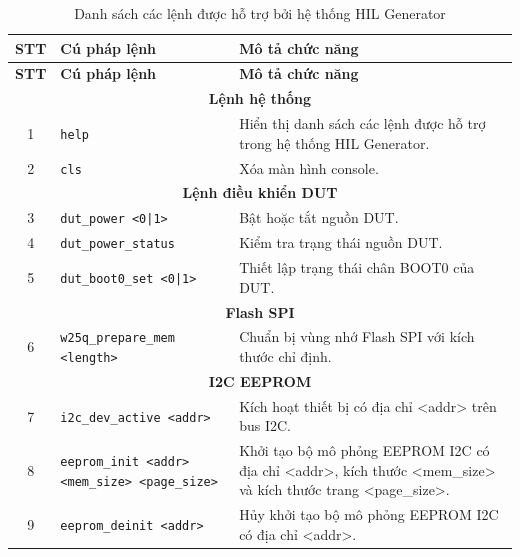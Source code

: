 \begin{longtable}{|c|p{4.8cm}|p{7.2cm}|}
\caption{Danh sách các lệnh được hỗ trợ bởi hệ thống HIL Generator}
\label{tab:hil_command_list} \\

\hline
\textbf{STT} & \textbf{Cú pháp lệnh} & \textbf{Mô tả chức năng} \\
\hline
\endfirsthead

\hline
\textbf{STT} & \textbf{Cú pháp lệnh} & \textbf{Mô tả chức năng} \\
\hline
\endhead

\multicolumn{3}{|c|}{\textbf{Lệnh hệ thống}} \\
\hline

1
& \texttt{help}
& Hiển thị danh sách các lệnh được hỗ trợ trong hệ thống HIL Generator. \\
\hline

2
& \texttt{cls}
& Xóa màn hình console. \\
\hline

\multicolumn{3}{|c|}{\textbf{Lệnh điều khiển DUT}} \\
\hline

3
& \texttt{dut\_power <0|1>}
& Bật hoặc tắt nguồn DUT. \\
\hline

4
& \texttt{dut\_power\_status}
& Kiểm tra trạng thái nguồn DUT. \\
\hline

5
& \texttt{dut\_boot0\_set <0|1>}
& Thiết lập trạng thái chân BOOT0 của DUT. \\
\hline

\multicolumn{3}{|c|}{\textbf{Flash SPI}} \\
\hline

6
& \texttt{w25q\_prepare\_mem <length>}
& Chuẩn bị vùng nhớ Flash SPI với kích thước chỉ định. \\
\hline

\multicolumn{3}{|c|}{\textbf{I2C EEPROM}} \\
\hline

7
& \texttt{i2c\_dev\_active <addr>}
& Kích hoạt thiết bị có địa chỉ <addr> trên bus I2C. \\
\hline

8
& \texttt{eeprom\_init <addr> <mem\_size> <page\_size>}
& Khởi tạo bộ mô phỏng EEPROM I2C có địa chỉ <addr>, kích thước <mem\_size> và kích thước trang <page\_size>. \\
\hline

9
& \texttt{eeprom\_deinit <addr>}
& Hủy khởi tạo bộ mô phỏng EEPROM I2C có địa chỉ <addr>. \\
\hline


\end{longtable}
